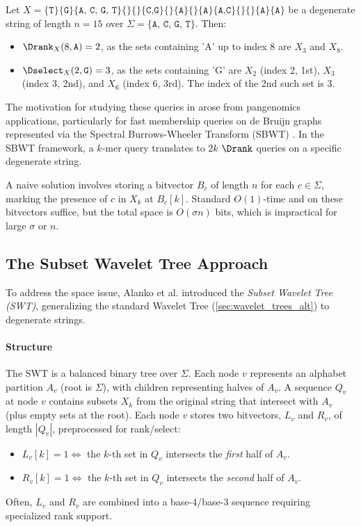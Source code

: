 \begin{example}
    Let $X = \{\texttt{T}\} \{\texttt{G}\} \{\texttt{A, C, G, T}\} \{\} \{\} \{\texttt{C,G}\} \{\} \{\texttt{A}\} \{\} \{\texttt{A}\} \{\texttt{A,C}\} \{\} \{\} \{\texttt{A}\} \{\texttt{A}\}$ be a degenerate string of length $n=15$ over $\Sigma = \{\texttt{A, C, G, T}\}$. Then:
    \begin{itemize}
        \item $\Drank_X(8, \texttt{A}) = 2$, as the sets containing 'A' up to index 8 are $X_3$ and $X_8$.
        \item $\Dselect_X(2, \texttt{G}) = 3$, as the sets containing 'G' are $X_2$ (index 2, 1st), $X_3$ (index 3, 2nd), and $X_6$ (index 6, 3rd). The index of the 2nd such set is 3.
    \end{itemize}
\end{example}

The motivation for studying these queries in \cite{SubsetWT} arose from pangenomics applications, particularly for fast membership queries on de Bruijn graphs represented via the Spectral Burrows-Wheeler Transform (SBWT) \cite{alanko2023small}. In the SBWT framework, a $k$-mer query translates to $2k$ $\Drank$ queries on a specific degenerate string.

A naive solution involves storing a bitvector $B_c$ of length $n$ for each $c \in \Sigma$, marking the presence of $c$ in $X_k$ at $B_c[k]$. Standard $O(1)$-time \Rank{} and \Select{} on these bitvectors suffice, but the total space is $O(\sigma n)$ bits, which is impractical for large $\sigma$ or $n$.

\subsection{The Subset Wavelet Tree Approach}

To address the space issue, Alanko et al. \cite{SubsetWT} introduced the \emph{Subset Wavelet Tree (SWT)}, generalizing the standard Wavelet Tree (\autoref{sec:wavelet_trees_alt}) to degenerate strings.

\paragraph{Structure} The SWT is a balanced binary tree over $\Sigma$. Each node $v$ represents an alphabet partition $A_v$ (root is $\Sigma$), with children representing halves of $A_v$. A sequence $Q_v$ at node $v$ contains subsets $X_k$ from the original string that intersect with $A_v$ (plus empty sets at the root). Each node $v$ stores two bitvectors, $L_v$ and $R_v$, of length $|Q_v|$, preprocessed for rank/select:
\begin{itemize}
    \item $L_v[k] = 1 \iff$ the $k$-th set in $Q_v$ intersects the \emph{first} half of $A_v$.
    \item $R_v[k] = 1 \iff$ the $k$-th set in $Q_v$ intersects the \emph{second} half of $A_v$.
\end{itemize}
Often, $L_v$ and $R_v$ are combined into a base-4/base-3 sequence requiring specialized rank support.


